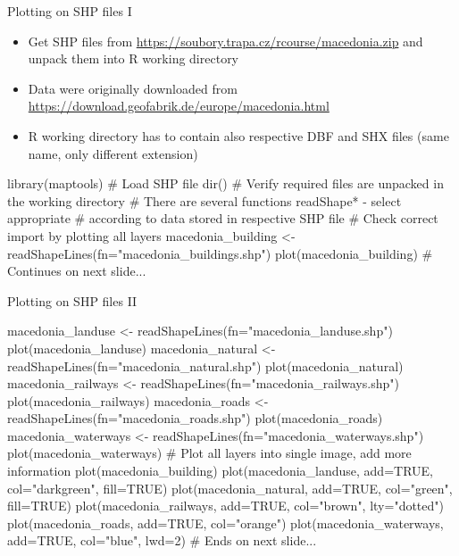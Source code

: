 \documentclass[compress, ucs, xelatex, 11pt, xcolor=svgnames,
  hyperref={
    bookmarks=true,
    unicode=true,
    colorlinks=true,
    pdftitle={Molecular data in R},
    plainpages=false,
    pdfauthor={Vojtech Zeisek},
    pdfsubject={Course about phylogeny and evolution in R},
    pdfcreator={XeLaTeX},
    pdfkeywords={R, evolution, phylogeny, molecular data},
    linkcolor=Tomato,
    anchorcolor=SaddleBrown,
    citecolor=Goldenrod,
    filecolor=DarkMagenta,
    menucolor=Sienna,
    urlcolor=DarkTurquoise,
    pdftex},
  url={hyphens, lowtilde} %
  ]{beamer}
\begin{document}
\begin{frame}[fragile]{Plotting on SHP files I}
  \begin{itemize}
    \item Get SHP files from \url{https://soubory.trapa.cz/rcourse/macedonia.zip} and unpack them into R working directory
    \item Data were originally downloaded from \url{https://download.geofabrik.de/europe/macedonia.html}
    \item R working directory has to contain also respective DBF and SHX files (same name, only different extension)
  \end{itemize}
  \begin{spluscode}
    library(maptools)
    # Load SHP file
    dir() # Verify required files are unpacked in the working directory
    # There are several functions readShape* - select appropriate
    # according to data stored in respective SHP file
    # Check correct import by plotting all layers
    macedonia_building <- readShapeLines(fn="macedonia_buildings.shp")
    plot(macedonia_building) # Continues on next slide...
  \end{spluscode}
\end{frame}

\begin{frame}[fragile]{Plotting on SHP files II}
  \begin{spluscode}
    macedonia_landuse <- readShapeLines(fn="macedonia_landuse.shp")
    plot(macedonia_landuse)
    macedonia_natural <- readShapeLines(fn="macedonia_natural.shp")
    plot(macedonia_natural)
    macedonia_railways <- readShapeLines(fn="macedonia_railways.shp")
    plot(macedonia_railways)
    macedonia_roads <- readShapeLines(fn="macedonia_roads.shp")
    plot(macedonia_roads)
    macedonia_waterways <- readShapeLines(fn="macedonia_waterways.shp")
    plot(macedonia_waterways)
    # Plot all layers into single image, add more information
    plot(macedonia_building)
    plot(macedonia_landuse, add=TRUE, col="darkgreen", fill=TRUE)
    plot(macedonia_natural, add=TRUE, col="green", fill=TRUE)
    plot(macedonia_railways, add=TRUE, col="brown", lty="dotted")
    plot(macedonia_roads, add=TRUE, col="orange")
    plot(macedonia_waterways, add=TRUE, col="blue", lwd=2)
    # Ends on next slide...
  \end{spluscode}
\end{frame}
\end{document}
